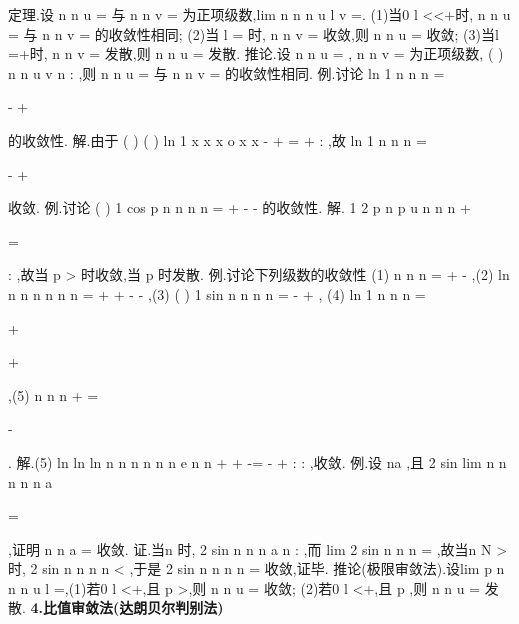 \textcolor{lyred}{定理}.设
n
n
u
\infty 
=\sum 
与
n
n
v
\infty 
=\sum 
为正项级数,lim
n
n
n
u
l
v
\to \infty 
=. 
(1)当0
l
<<+\infty 时,
n
n
u
\infty 
=\sum 
与
n
n
v
\infty 
=\sum 
的收敛性相同; 
(2)当
l =
时,
n
n
v
\infty 
=\sum 
收敛,则
n
n
u
\infty 
=\sum 
收敛; 
(3)当l =+\infty 时,
n
n
v
\infty 
=\sum 
发散,则
n
n
u
\infty 
=\sum 
发散. 
\textcolor{lyred}{推论}.设
n
n
u
\infty 
=\sum 
,
n
n
v
\infty 
=\sum 
为正项级数,
(
)
n
n
u
v
n \to \infty 
:
,则
n
n
u
\infty 
=\sum 
与
n
n
v
\infty 
=\sum 
的收敛性相同. 
\textcolor{lyred}{例}.讨论
ln 1
n
n
n
\infty 
=




-
+








\sum 
的收敛性. 
解.由于
(
)
(
)
ln 1
x
x
x
o x
x
-
+
=
+
:
,故
ln 1
n
n
n
\infty 
=




-
+








\sum 
收敛. 
\textcolor{lyred}{例}.讨论
(
)
1 cos
p
n
n
n
n
\infty 
=
+
-
-
\sum 
的收敛性. 
解.
1 2
p
n
p
u
n
n
n
+

\cdots 
\cdots 
=
\cdots 




:
,故当
p >
时收敛,当
p \le 
时发散. 
\textcolor{lyred}{例}.讨论下列级数的收敛性 
(1)
n
n
n
\infty 
=
+
-
\sum 
,(2)
ln
n
n
n
n
n
n
\infty 
=
+
+
-
-
\sum 
,(3)
(
)
1 sin
n
n
n
n
\infty 
=
-
+
\sum 
, 
(4)
ln 1
n
n
n
\infty 
=


+


+


\sum 
,(5)
n
n
n
\infty 
+
=


-






\sum 
. 
解.(5)
ln
ln
ln
n
n
n
n
n
n
e
n
n
+
+
-=
-
+
:
:
,收敛. 
\textcolor{lyred}{例}.设
na \ge 
,且
2 sin
lim
n
n
n
n
n
a
\to \infty 


\cdots 
=




,证明
n
n
a
\infty 
=\sum 
收敛. 
证.当n \to \infty 时,
2 sin
n
n
n
a
n
:
,而
lim 2 sin
n
n
n
\to \infty 
=
,故当n
N
>
时,
2 sin
n
n
n
n
<
,于是 
2 sin
n
n
n
n
\infty 
=\sum 
收敛,证毕. 
\textcolor{lyred}{推论(极限审敛法)}.设lim
p
n
n
n u
l
\to \infty 
=,(1)若0
l
\le <+\infty ,且
p >,则
n
n
u
\infty 
=\sum 
收敛; 
(2)若0
l
<\le +\infty ,且
p \le ,则
n
n
u
\infty 
=\sum 
发散. 
{\bfseries \textcolor{lyred}{4.比值审敛法(达朗贝尔判别法)}}

